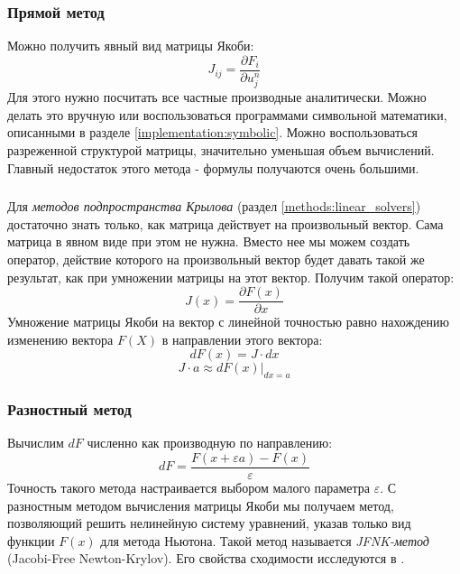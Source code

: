 \subsubsection*{Прямой метод}
Можно получить явный вид матрицы Якоби: 
\begin{equation}
    J_{ij} = \frac{\partial F_i}{\partial u^n_j}
\end{equation}
Для этого нужно посчитать все частные производные аналитически. Можно делать это вручную или воспользоваться программами символьной математики, описанными в разделе \ref{implementation:symbolic}. Можно воспользоваться разреженной структурой матрицы, значительно уменьшая объем вычислений. Главный недостаток этого метода - формулы получаются очень большими.

\subsubsection*{}
Для \textit{методов подпространства Крылова} (раздел \ref{methods:linear_solvers}) достаточно знать только, как матрица действует на произвольный вектор. Сама матрица в явном виде при этом не нужна. Вместо нее мы можем создать оператор, действие которого на произвольный вектор будет давать такой же результат, как при умножении матрицы на этот вектор. Получим такой оператор:
\begin{equation}
J(x) = \frac {\partial F(x)} {\partial x}
\end{equation}
Умножение матрицы Якоби на вектор с линейной точностью равно нахождению изменению вектора $F(X)$ в направлении этого вектора:
\begin{equation}
dF(x) = J \cdot dx
\end{equation}
\begin{equation}
J \cdot a \approx dF(x) \vert_{dx = a}
\end{equation}

\subsubsection*{Разностный метод}
Вычислим $dF$ численно как производную по направлению:
\begin{equation}
dF = \frac{F(x + \varepsilon a) - F(x)}{\varepsilon}
\end{equation}
Точность такого метода настраивается выбором малого параметра $\varepsilon$. С разностным методом вычисления матрицы Якоби мы получаем метод, позволяющий решить нелинейную систему уравнений, указав только вид функции $F(x)$ для метода Ньютона. Такой метод называется \textit{JFNK-метод} (Jacobi-Free Newton-Krylov). Его свойства сходимости исследуются в \cite{JFNK}.

